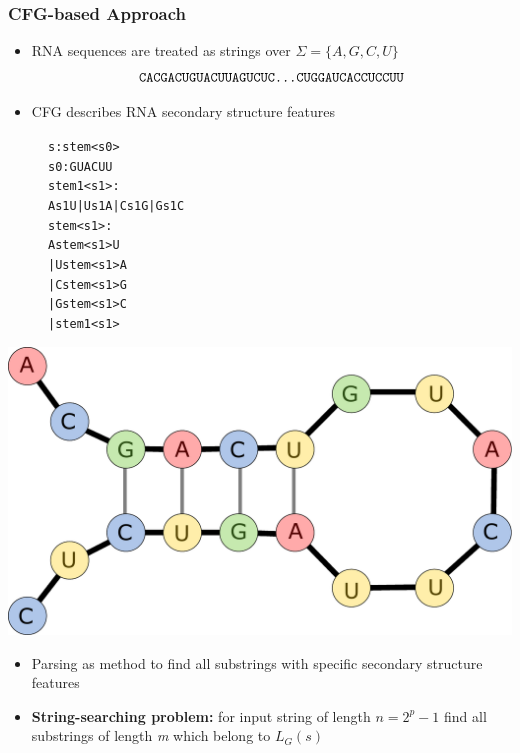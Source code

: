 \documentclass[xcolor=table]{beamer}
\begin{document}
\begin{frame}[fragile] \frametitle{CFG-based Approach}

    \begin{itemize}
        \item RNA sequences are treated as strings over $\Sigma = \{A, G, C, U\}$
        $$
        \texttt{CACGACUGUACUUAGUCUC\dots CUGGAUCACCUCCUU}
        $$
        \item CFG describes RNA secondary structure features
    \end{itemize}
        \begin{figure}[t]
            \begin{minipage}{0.4\textwidth}
            \footnotesize
            \begin{alltt}
                s: stem<s0>
                s0: G U A C U U
                stem1<s1>:  
                  A s1 U | U s1 A | C s1 G | G s1 C 
                stem<s1>:
                  A stem<s1> U
                  | U stem<s1> A
                  | C stem<s1> G
                  | G stem<s1> C
                  | stem1<s1>
            \end{alltt}
            \end{minipage}
        \end{figure}

        \vspace{-100pt}\hspace{30pt}\includegraphics[width = 0.4\linewidth]{pic/16s.pdf}\par 
        \pause
        \begin{itemize}
            \item Parsing as method to find all substrings with specific secondary structure features
            \item \textbf{String-searching problem:} for input string of length $n = 2^p - 1$ find all substrings of length \textit{m} which belong to $L_G(s)$
        \end{itemize}

\end{frame}
\end{document}
